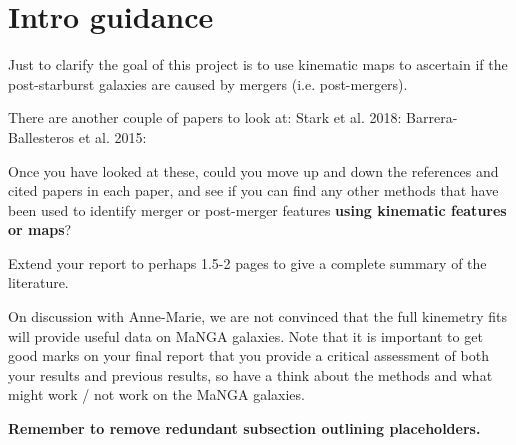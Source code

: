 \section*{Intro guidance}

Just to clarify the goal of this project is to use kinematic maps to ascertain if the post-starburst galaxies are caused by mergers (i.e. post-mergers). 

There are another couple of papers to look at:
Stark et al. 2018: \citep{2018MNRAS.480.2217S} 
Barrera-Ballesteros et al. 2015: \citep{2015A&A...582A..21B}
 
Once you have looked at these, could you move up and down the references and cited papers in each paper, and see if you can find any other methods that have been used to identify merger or post-merger features \textbf{using kinematic features or maps}?
 
Extend your report to perhaps 1.5-2 pages to give a complete summary of the literature.

On discussion with Anne-Marie, we are not convinced that the full kinemetry fits will provide useful data on MaNGA galaxies. Note that it is important to get good marks on your final report that you provide a critical assessment of both your results and previous results, so have a think about the methods and what might work / not work on the MaNGA galaxies. 

\vspace{6pt}
\textbf{Remember to remove redundant subsection outlining placeholders.}
